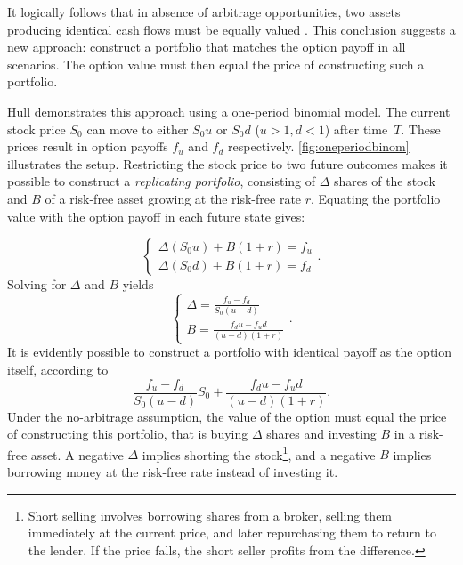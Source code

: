 \documentclass[english,12pt,a4paper,pdftex,sci,utf8]{aaltothesis}
\begin{document}
It logically follows that in absence of arbitrage opportunities, two assets producing identical cash flows must be equally valued \cite{hull2018, wilmott2013paul}. This conclusion suggests a new approach: construct a portfolio that matches the option payoff in all scenarios. The option value must then equal the price of constructing such a portfolio.

Hull \cite{hull2018} demonstrates this approach using a one-period binomial model. The current stock price $S_0$ can move to either $S_0u$ or $S_0d$ ($u>1,d<1$) after time~$T$. These prices result in option payoffs $f_u$ and $f_d$ respectively. \cref{fig:oneperiodbinom} illustrates the setup. Restricting the stock price to two future outcomes makes it possible to construct a \emph{replicating portfolio}, consisting of $\Delta$ shares of the stock and $B$ of a risk-free asset growing at the risk-free rate $r$. Equating the portfolio value with the option payoff in each future state gives:

\begin{equation*}
\begin{cases}
    \Delta (S_0u) + B(1+r) = f_u\\
    \Delta (S_0d) + B(1+r) = f_d
\end{cases}.
\end{equation*}
Solving for $\Delta$ and $B$ yields
\begin{equation*}
\begin{cases}
    \Delta = \frac{f_u - f_d}{S_0(u-d)}\\
    B = \frac{f_du-f_ud}{(u-d)(1+r)}
\end{cases}.
\end{equation*}
It is evidently possible to construct a portfolio with identical payoff as the option itself, according to
\begin{equation}
     \frac{f_u - f_d}{S_0(u-d)} S_0 + \frac{f_du-f_ud}{(u-d)(1+r)}
\label{eq:replicating-portfolio}.
\end{equation}
Under the no-arbitrage assumption, the value of the option must equal the price of constructing this portfolio, that is buying $\Delta$ shares and investing $B$ in a risk-free asset. A negative $\Delta$ implies shorting the stock\footnote{Short selling involves borrowing shares from a broker, selling them immediately at the current price, and later repurchasing them to return to the lender. If the price falls, the short seller profits from the difference.}, and a negative $B$ implies borrowing money at the risk-free rate instead of investing it.
\end{document}
